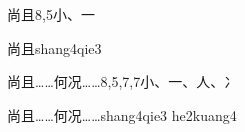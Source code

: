 \begin{entry}{尚且}{8,5}{⼩、⼀}
  \begin{phonetics}{尚且}{shang4qie3}
  \end{phonetics}
\end{entry}

\begin{entry}{尚且……何况……}{8,5,7,7}{⼩、⼀、⼈、⼎}
  \begin{phonetics}{尚且……何况……}{shang4qie3 he2kuang4}
  \end{phonetics}
\end{entry}


